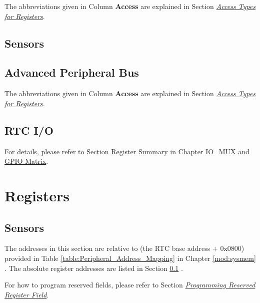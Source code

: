 \documentclass[main\_\_EN.tex]{subfiles}
\begin{document}
The abbreviations given in Column \textbf{Access} are explained in Section \hyperref[glossary-access-types]{\textit{Access Types for Registers}}.


\subsection{Sensors}\label{sec:sensor-reg-summ}



\subsection{Advanced Peripheral Bus}\label{sec:apb-reg-summ}

The abbreviations given in Column \textbf{Access} are explained in Section \hyperref[glossary-access-types]{\textit{Access Types for Registers}}.



\subsection{RTC I/O}

For details, please refer to Section \hyperref[section:4.12]{Register Summary} in Chapter \hyperref[mod:iomuxgpio]{IO\_MUX and GPIO Matrix}.


\newpage
\section{Registers}
\label{section:registers}

\subsection{Sensors}

The addresses in this section are relative to (the RTC base address + 0x0800) provided in Table \ref{table:Peripheral_Address_Mapping} in Chapter \ref{mod:sysmem} \textit{}. The absolute register addresses are listed in Section \ref{sec:sensor-reg-summ} \textit{}. 

For how to program reserved fields, please refer to Section \hyperref[programming-reserved-field]{\textit{Programming Reserved Register Field}}.


\end{document}
